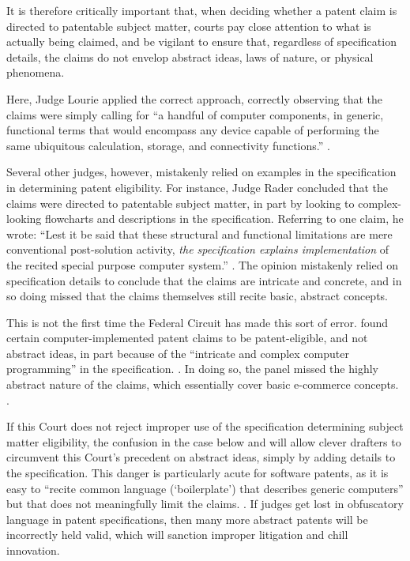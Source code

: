 \documentclass{scotus}
\begin{document}
It is therefore
critically important that, when deciding whether a patent claim is directed to
patentable subject matter, courts pay close
attention to what is actually being claimed, and be vigilant to ensure that,
regardless of specification details, the claims do not envelop abstract ideas,
laws of nature, or physical phenomena.

Here, Judge Lourie applied the correct approach,
correctly observing that the claims were simply calling for ``a handful of
computer components, in generic, functional terms that would encompass any
device capable of performing the same ubiquitous calculation, storage, and
connectivity functions.'' .

Several other judges, however, mistakenly relied on examples in the
specification in determining patent eligibility.
For instance, Judge Rader concluded that the claims
were directed to patentable subject matter, in part by looking to
complex-looking flowcharts and descriptions in the specification. Referring to
one claim, he wrote: ``Lest it be
said that these structural and functional limitations are
mere conventional post-solution activity, \emph{the specification explains
implementation} of the recited special purpose computer system.''
. The opinion mistakenly relied on
specification details to conclude that the claims are intricate and concrete,
and in so doing missed that the claims themselves still recite basic, abstract
concepts.

This is not the first time the Federal Circuit has made this sort of error.
 found certain
computer-implemented patent claims to be patent-eligible, and not abstract
ideas, in part because of the ``intricate and complex computer programming''
in the specification. . In doing so, the panel missed the
highly abstract nature of the claims, which essentially cover basic e-commerce
concepts. .

If this Court does not reject improper use of the specification
determining subject matter eligibility, the confusion in the case below
and  will allow clever
drafters to circumvent this Court's precedent on abstract ideas,
simply by adding details to the specification. This danger is particularly acute
for software patents, as it is easy to ``recite common language (`boilerplate')
that
describes generic computers'' but that does
not meaningfully limit the claims.
. If judges get lost in obfuscatory
language in patent specifications, then many more abstract patents will be
incorrectly held valid, which will sanction improper litigation and
chill innovation.
\end{document}
